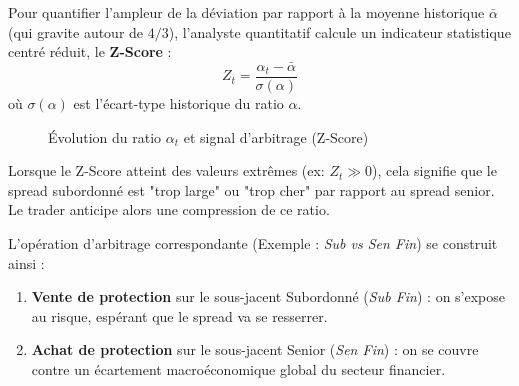 Pour quantifier l'ampleur de la déviation par rapport à la moyenne historique $\bar{\alpha}$ (qui gravite autour de $4/3$), l'analyste quantitatif calcule un indicateur statistique centré réduit, le \textbf{Z-Score} :
\begin{equation}
    Z_t = \frac{\alpha_t - \bar{\alpha}}{\sigma(\alpha)}
\end{equation}
où $\sigma(\alpha)$ est l'écart-type historique du ratio $\alpha$.

\begin{figure}[H]
    \centering
    \caption{Évolution du ratio $\alpha_t$ et signal d'arbitrage (Z-Score)}
\end{figure}

Lorsque le Z-Score atteint des valeurs extrêmes (ex: $Z_t \gg 0$), cela signifie que le spread subordonné est "trop large" ou "trop cher" par rapport au spread senior. Le trader anticipe alors une compression de ce ratio.

L'opération d'arbitrage correspondante (Exemple : \textit{Sub vs Sen Fin}) se construit ainsi :
\begin{enumerate}
    \item \textbf{Vente de protection} sur le sous-jacent Subordonné (\textit{Sub Fin}) : on s'expose au risque, espérant que le spread va se resserrer.
    \item \textbf{Achat de protection} sur le sous-jacent Senior (\textit{Sen Fin}) : on se couvre contre un écartement macroéconomique global du secteur financier.
\end{enumerate}

